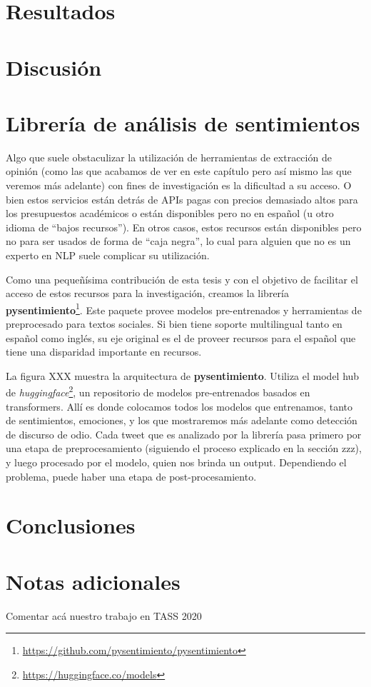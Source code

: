 \section{Resultados}

\section{Discusión}

\section{Librería de análisis de sentimientos}

\newcommand{\pysentimiento}[0]{\textbf{pysentimiento}}

Algo que suele obstaculizar la utilización de herramientas de extracción de opinión (como las que acabamos de ver en este capítulo pero así mismo las que veremos más adelante) con fines de investigación es la dificultad a su acceso. O bien estos servicios están detrás de APIs pagas con precios demasiado altos para los presupuestos académicos o están disponibles pero no en español (u otro idioma de ``bajos recursos''). En otros casos, estos recursos están disponibles pero no para ser usados de forma de ``caja negra'', lo cual para alguien que no es un experto en NLP suele complicar su utilización.

Como una pequeñísima contribución de esta tesis y con el objetivo de facilitar el acceso de estos recursos para la investigación, creamos la librería \textbf{pysentimiento}\footnote{\url{https://github.com/pysentimiento/pysentimiento}}. Este paquete provee modelos pre-entrenados y herramientas de preprocesado para textos sociales. Si bien tiene soporte multilingual tanto en español como inglés, su eje original es el de proveer recursos para el español que tiene una disparidad importante en recursos.

La figura XXX muestra la arquitectura de \pysentimiento{}. Utiliza el model hub de \emph{huggingface}\footnote{\url{https://huggingface.co/models}}, un repositorio de modelos pre-entrenados basados en transformers. Allí es donde colocamos todos los modelos que entrenamos, tanto de sentimientos, emociones, y los que mostraremos más adelante como detección de discurso de odio. Cada tweet que es analizado por la librería pasa primero por una etapa de preprocesamiento (siguiendo el proceso explicado en la sección zzz), y luego procesado por el modelo, quien nos brinda un output. Dependiendo el problema, puede haber una etapa de post-procesamiento.




%
%
%

\section{Conclusiones}

\section{Notas adicionales}

Comentar acá nuestro trabajo en TASS 2020